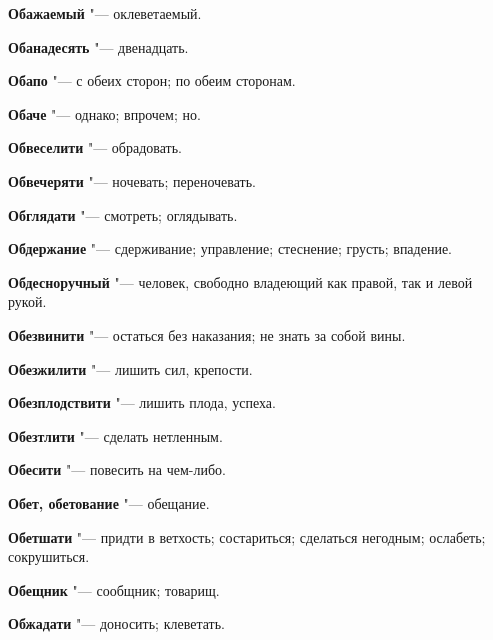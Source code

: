 \begin{mymulticols}{2}
\noindent\textbf{Обажаемый} "--- оклеветаемый. 




\noindent\textbf{Обанадесять} "--- двенадцать. 




\noindent\textbf{Обапо} "--- с обеих сторон; по обеим сторонам. 




\noindent\textbf{Обаче} "--- однако; впрочем; но. 




\noindent\textbf{Обвеселити} "--- обрадовать. 




\noindent\textbf{Обвечеряти} "--- ночевать; переночевать. 




\noindent\textbf{Обглядати} "--- смотреть; оглядывать. 




\noindent\textbf{Обдержание} "--- сдерживание; управление; стеснение; грусть; впадение. 




\noindent\textbf{Обдесноручный} "--- человек, свободно владеющий как правой, так и левой рукой. 




\noindent\textbf{Обезвинити} "--- остаться без наказания; не знать за собой вины. 




\noindent\textbf{Обезжилити} "--- лишить сил, крепости. 




\noindent\textbf{Обезплодствити} "--- лишить плода, успеха. 




\noindent\textbf{Обезтлити} "--- сделать нетленным. 




\noindent\textbf{Обесити} "--- повесить на чем-либо. 




\noindent\textbf{Обет, обетование} "--- обещание. 




\noindent\textbf{Обетшати} "--- придти в ветхость; состариться; сделаться негодным; ослабеть; сокрушиться. 




\noindent\textbf{Обещник} "--- сообщник; товарищ. 




\noindent\textbf{Обжадати} "--- доносить; клеветать. 





\end{mymulticols}
